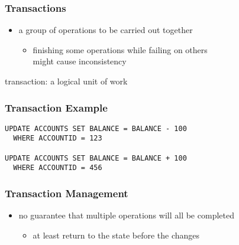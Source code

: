 \documentclass[dvipsnames]{beamer}
\theoremstyle{plain}
\begin{document}
\begin{frame}
  \frametitle{Transactions}

  \begin{itemize}
    \item a group of operations to be carried out together
    \begin{itemize}
      \item finishing some operations while failing on others\\
	might cause inconsistency
    \end{itemize}
  \end{itemize}

  \pause
  \begin{definition}
    \alert{transaction}: a logical unit of work
  \end{definition}
\end{frame}

\begin{frame}[fragile]
  \frametitle{Transaction Example}

  \begin{example}
    \begin{lstlisting}
UPDATE ACCOUNTS SET BALANCE = BALANCE - 100
  WHERE ACCOUNTID = 123

UPDATE ACCOUNTS SET BALANCE = BALANCE + 100
  WHERE ACCOUNTID = 456
    \end{lstlisting}
  \end{example}
\end{frame}

\begin{frame}
  \frametitle{Transaction Management}

  \begin{itemize}
    \item no guarantee that multiple operations will all be completed
    \begin{itemize}
      \item at least return to the state before the changes
    \end{itemize}
  \end{itemize}
\end{frame}
\end{document}
